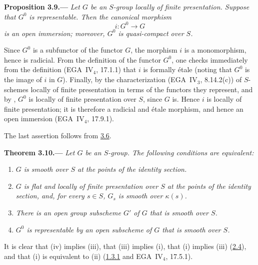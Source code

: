 
\medskip
{}\label{prop:sga3-VIB-3.9}%
\noindent\textbf{Proposition 3.9.---}
\emph{Let \(G\) be an \(S\)-group locally of finite presentation.
Suppose that \(G^0\) is representable. Then the canonical morphism}
\[
  i:G^0\longrightarrow G
\]
\emph{is an open immersion; moreover, \(G^0\) is quasi-compact over
\(S\).}

Since \(G^0\) is a subfunctor of the functor \(G\), the morphism
\(i\) is a monomorphism, hence is radicial. From the definition of
the functor \(G^0\), one checks immediately from the definition
(EGA~IV\(_4\), 17.1.1) that \(i\) is formally \'etale (noting that
\(G^0\) is the image of \(i\) in \(G\)). Finally, by the
characterization (EGA~IV\(_3\), 8.14.2(c)) of \(S\)-schemes locally
of finite presentation in terms of the functors they represent, and
by , \(G^0\) is locally of finite presentation over \(S\), since
\(G\) is. Hence \(i\) is locally of finite presentation; it is
therefore a radicial and \'etale morphism, and hence an open immersion
(EGA~IV\(_4\), 17.9.1).

The last assertion follows from \hyperref[cor:sga3-VIB-3.6]{3.6}.

\medskip
{}\label{thm:sga3-VIB-3.10}%
\noindent\textbf{Theorem 3.10.---}
\emph{Let \(G\) be an \(S\)-group. The following conditions are
equivalent:}
\begin{enumerate}
\item[\textup{(i)}] \emph{\(G\) is smooth over \(S\) at the points
  of the identity section.}
\item[\textup{(ii)}] \emph{\(G\) is flat and locally of finite
  presentation over \(S\) at the points of the identity section,
  and, for every \(s\in S\), \(G_s\) is smooth over \(\kappa(s)\).}
\item[\textup{\SGAInlineRefTarget{thm:sga3-VIB-3.10:item:iii}(iii)}] \emph{There is an open group subscheme \(G'\)
  of \(G\) that is smooth over \(S\).}
\item[\textup{\SGAInlineRefTarget{thm:sga3-VIB-3.10:item:iv}(iv)}] \emph{\(G^0\) is representable by an open
  subscheme of \(G\) that is smooth over \(S\).}
\end{enumerate}

It is clear that \textup{(iv)} implies \textup{(iii)}, that \textup{(iii)}
implies \textup{(i)}, that \textup{(i)} implies \textup{(iii)} (\hyperref[cor:sga3-VIB-2.4]{2.4}), and that
\textup{(i)} is equivalent to \textup{(ii)} (\hyperref[cor:sga3-VIB-1.3.1]{1.3.1} and EGA~IV\(_4\), 17.5.1).


